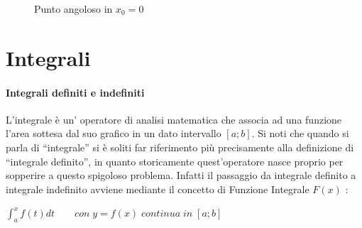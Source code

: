 \documentclass[a4paper,12pt]{report}
\begin{document}
\begin{enumerate}
\begin{figure}[ht]
\begin{center}
	\caption{Punto angoloso in $x_{0} = 0$}
\end{center}
\end{figure}

\end{enumerate}

\section{Integrali}
\paragraph{Integrali definiti e indefiniti}
L’integrale è un’ operatore di analisi matematica che associa ad una funzione l’area sottesa dal suo grafico in un dato intervallo $[a;b]$. Si noti che quando si parla di “integrale” si è soliti far riferimento più precisamente alla definizione di “integrale definito”, in quanto storicamente quest’operatore nasce proprio per sopperire a questo spigoloso problema. Infatti il passaggio da integrale definito a integrale indefinito avviene mediante il concetto di Funzione Integrale $F(x)$ : \\

\begin{center}
$\int_{a}^{x}f(t)dt \qquad con\; y=f(x)\; continua\; in\; [a;b]$
\end{center}
\end{document}
